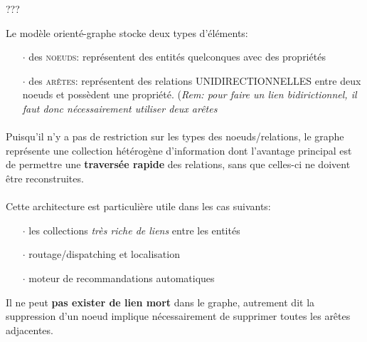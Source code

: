 \item{}
{???}
{}


\item{}
{Le modèle orienté-graphe stocke deux types d'éléments:
\begin{itemize}
\item[$\cdot$]des \textcolor{ltred}{\textsc{noeuds}}: représentent des entités quelconques avec des propriétés
\item[$\cdot$]des \textcolor{ltred}{\textsc{arêtes}}: représentent des relations UNIDIRECTIONNELLES entre deux noeuds et possèdent une propriété. (\textit{Rem: pour faire un lien bidirictionnel, il faut donc nécessairement utiliser deux arêtes}
\end{itemize}

\paragraph{}
Puisqu'il n'y a pas de restriction sur les types des noeuds/relations, le graphe représente une collection hétérogène d'information dont l'avantage principal est de permettre une \textbf{traversée rapide} des relations, sans que celles-ci ne doivent être reconstruites.

\paragraph{}
Cette architecture est particulière utile dans les cas suivants:
\begin{itemize}
\item[$\cdot$]les collections \textit{très riche de liens} entre les entités
\item[$\cdot$]routage/dispatching et localisation
\item[$\cdot$]moteur de recommandations automatiques
\end{itemize}
}


\item{}
{\vrai}
{
Il ne peut \textbf{pas exister de lien mort} dans le graphe, autrement dit la suppression d'un noeud implique nécessairement de supprimer toutes les arêtes adjacentes.
}



